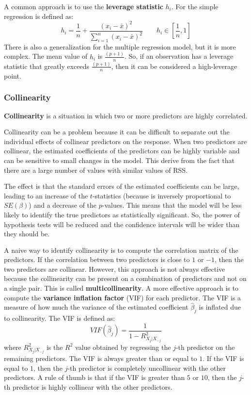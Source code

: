 A common approach is to use the \textbf{leverage statistic} $h_{i}$. For the simple regression is defined as:
\[
    h_{i} = \frac{1}{n} + \frac{(x_i - \bar{x})^2}{\sum_{i=1}^{n}(x_i - \bar{x})^2}\qquad h_i\in\left[\frac 1n, 1\right]
\]
There is also a generalization for the multiple regression model, but it is more complex.
The mean value of $h_i$ is $\frac{(p+1)}n$. So, if an observation has a leverage statistic that greatly exceeds $\frac{(p+1)}{n}$, then it can be considered a high-leverage point.
\subsubsection*{Collinearity}
\textbf{Collinearity} is a situation in which two or more predictors are highly correlated.

Collinearity can be a problem because it can be difficult to separate out the individual effects of collinear predictors on the response.
When two predictors are collinear, the estimated coefficients of the predictors can be highly variable and can be sensitive to small changes in the model. This derive from the fact that there are a large number of values with similar values of RSS.

The effect is that the standard errors of the estimated coefficients can be large, leading to an increase of the $t$-statistics (because is inversely proportional to $SE(\beta)$) and a decrease of the $p$-values. This means that the model will be less likely to identify the true predictors as statistically significant.
So, the power of hypothesis tests will be reduced and the confidence intervals will be wider than they should be.

A naive way to identify collinearity is to compute the correlation matrix of the predictors. If the correlation between two predictors is close to $1$ or $-1$, then the two predictors are collinear. However, this approach is not always effective because the collinearity can be present on a combination of predictors and not on a single pair. This is called \textbf{multicollinearity}.
A more effective approach is to compute the \textbf{variance inflation factor} (VIF) for each predictor. The VIF is a measure of how much the variance of the estimated coefficient $\hat{\beta}_j$ is inflated due to collinearity. The VIF is defined as:
\[
    VIF(\hat{\beta}_j) = \frac{1}{1-R^2_{X_j|X_{-j}}}
\]
where $R^2_{X_j|X_{-j}}$ is the $R^2$ value obtained by regressing the $j$-th predictor on the remaining predictors. The VIF is always greater than or equal to $1$. If the VIF is equal to $1$, then the $j$-th predictor is completely uncollinear with the other predictors.
A rule of thumb is that if the VIF is greater than $5$ or $10$, then the $j$-th predictor is highly collinear with the other predictors.

